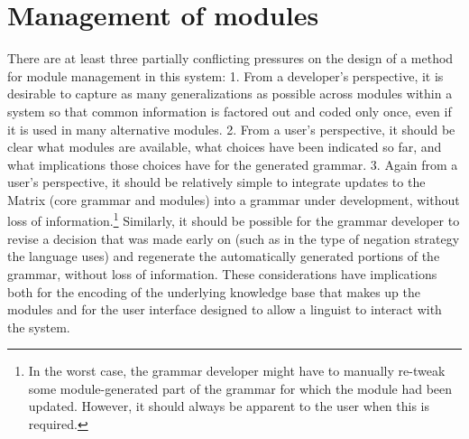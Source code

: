 \section{Management of modules}
\label{management}

There are at least three partially conflicting pressures on the design
of a method for module management in this system: 1. From a developer's
perspective, it is desirable to capture as many generalizations as
possible across modules within a system so that common information is
factored out and coded only once, even if it is used in many
alternative modules. 2. From a user's perspective, it should be clear
what modules are available, what choices have been indicated so far,
and what implications those choices have for the generated grammar.
3. Again from a user's perspective, it should be relatively simple to
integrate updates to the Matrix (core grammar and modules) into a
grammar under development, without loss of information.\footnote{In
the worst case, the grammar developer might have to manually re-tweak
some module-generated part of the grammar for which the module had
been updated.  However, it should always be apparent to the user when
this is required.}  Similarly, it should be possible for the grammar
developer to revise a decision that was made early on (such as in the
type of negation strategy the language uses) and regenerate the
automatically generated portions of the grammar, without loss of
information.  These considerations have implications both for the
encoding of the underlying knowledge base that makes up the modules
and for the user interface designed to allow a linguist to interact
with the system.

